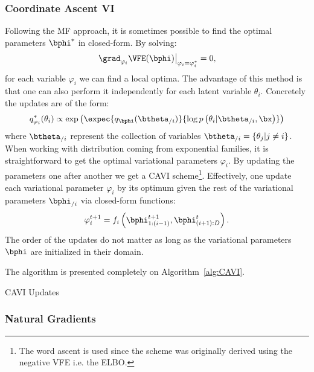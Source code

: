 \subsubsection{Coordinate Ascent VI}

Following the \ac{MF} approach, it is sometimes possible to find the optimal parameters $\bphi^*$ in closed-form.
By solving:
\begin{align}
\left.\grad_{\varphi_i}\VFE(\bphi)\right\vert_{\varphi_i=\varphi_i^*} = 0,
\end{align}
for each variable $\varphi_i$ we can find a local optima.
The advantage of this method is that one can also perform it independently for each latent variable $\theta_i$.
Concretely the updates are of the form:
\begin{align}
q_{\varphi_i}^*(\theta_i) \propto \exp\left(\expec{q_{\bphi}(\btheta_{/i})}{\log p\left(\theta_i|\btheta_{/i},\bx\right)}\right)
\end{align}
where $\btheta_{/i}$ represent the collection of variables $\btheta_{/i} = \{\theta_j | j \neq i\}$.
When working with distribution coming from exponential families, it is straightforward to get the optimal variational parameters $\varphi_i$.
By updating the parameters one after another we get a \ac{CAVI} scheme\footnote{The word ascent is used since the scheme was originally derived using the negative \ac{VFE} i.e. the \ac{ELBO}.}.
Effectively, one update each variational parameter $\varphi_i$ by its optimum given the rest of the variational parameters $\bphi_{/i}$ via closed-form functions:
\begin{align}
\varphi_i^{t+1} = f_i\left(\bphi_{1:(i-1)}^{t+1}, \bphi_{(i+1):D}^t\right).
\end{align}
The order of the updates do not matter as long as the variational parameters $\bphi$ are initialized in their domain.

The algorithm is presented completely on Algorithm~\ref{alg:CAVI}.

\begin{algorithm}
    \caption{\ac{CAVI} Updates}
    \label{alg:CAVI}
\end{algorithm}


\subsubsection{Natural Gradients}

